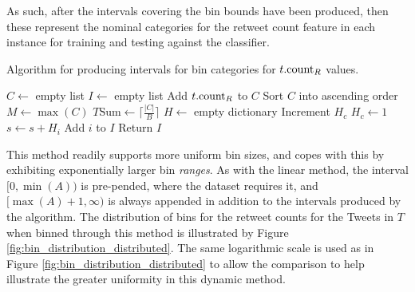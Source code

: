 As such, after the intervals covering the bin bounds have been produced, then these represent the nominal categories for the retweet count feature in each instance for training and testing against the classifier.

\begin{algorithm}
\caption{Algorithm for producing intervals for bin categories for $t.\textrm{count}_R$ values.}
\begin{algorithmic}[1]
    \State $C\gets$ empty list 
    \State $I\gets$ empty list 
        \State Add $t.\textrm{count}_R$ to $C$
    \EndFor
    \State Sort $C$ into ascending order 
    \State $M\gets\max(C)$ 
    \State $T\textrm{Sum}\gets\lceil\frac{|C|}{B}\rceil$ 
    \State $H\gets$ empty dictionary 
    \Statex
            \State Increment $H_c$
        \Else
            \State $H_c\gets1$
        \EndIf
    \EndFor
            \State $s\gets s + H_i$
        \EndIf
            \State Add $i$ to $I$
        \EndIf
    \EndFor
    \State Return $I$
\EndProcedure
\end{algorithmic}
\label{algo2}
\end{algorithm}
 
This method readily supports more uniform bin sizes, and copes with this by exhibiting exponentially larger bin \textit{ranges}. As with the linear method, the interval $[0,\min({A}))$ is pre-pended, where the dataset requires it, and $[\max({A})+1,\infty)$ is always appended in addition to the intervals produced by the algorithm. The distribution of bins for the retweet counts for the Tweets in $T$ when binned through this method is illustrated by Figure \ref{fig:bin_distribution_distributed}. The same logarithmic scale is used as in Figure \ref{fig:bin_distribution_distributed} to allow the comparison to help illustrate the greater uniformity in this dynamic method.


